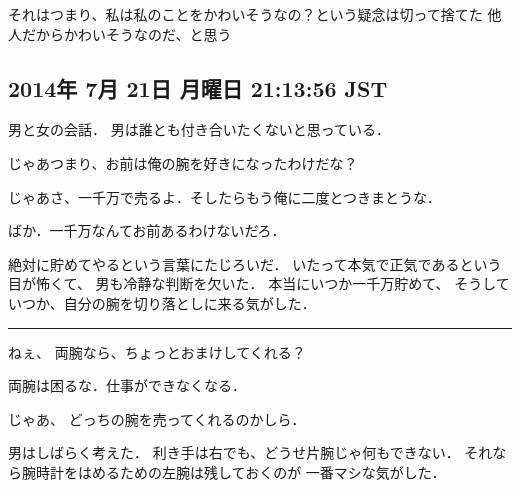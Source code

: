 それはつまり、私は私のことをかわいそうなの？という疑念は切って捨てた
他人だからかわいそうなのだ、と思う

\subsection{2014年 7月 21日 月曜日 21:13:56 JST}

男と女の会話． 男は誰とも付き合いたくないと思っている．

じゃあつまり、お前は俺の腕を好きになったわけだな？

じゃあさ、一千万で売るよ．そしたらもう俺に二度とつきまとうな．

ばか．一千万なんてお前あるわけないだろ．

絶対に貯めてやるという言葉にたじろいだ．
いたって本気で正気であるという目が怖くて、 男も冷静な判断を欠いた．
本当にいつか一千万貯めて、
そうしていつか、自分の腕を切り落としに来る気がした．

\begin{center}\rule{3in}{0.4pt}\end{center}

ねぇ、 両腕なら、ちょっとおまけしてくれる？

両腕は困るな．仕事ができなくなる．

じゃあ、 どっちの腕を売ってくれるのかしら．

男はしばらく考えた． 利き手は右でも、どうせ片腕じゃ何もできない．
それなら腕時計をはめるための左腕は残しておくのが 一番マシな気がした．
